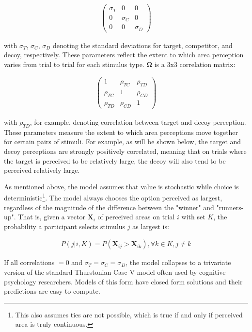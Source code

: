 \begin{align}
   \begin{pmatrix}
      \sigma_{T} & 0 & 0 \\
      0 & \sigma_{C} & 0 \\
      0 & 0 & \sigma_{D} 
   \end{pmatrix}
\label{eqn:S}
\end{align}

with $\sigma_{T}$, $\sigma_{C}$, $\sigma_{D}$ denoting the standard deviations for target, competitor, and decoy, respectively. These parameters reflect the extent to which area perception varies from trial to trial for each stimulus type. $\boldsymbol{\Omega}$ is a $3\text{x}3$ correlation matrix:

\begin{align}
   \begin{pmatrix}
      1 & \rho_{TC} & \rho_{TD} \\
      \rho_{TC} & 1 & \rho_{CD} \\
      \rho_{TD} & \rho_{CD} & 1 
   \end{pmatrix}
\label{eqn:O}
\end{align}

with $\rho_{TD}$, for example, denoting correlation between target and decoy perception. These parameters measure the extent to which area perceptions move together for certain pairs of stimuli. For example, as will be shown below, the target and decoy perceptions are strongly positively correlated, meaning that on trials where the target is perceived to be relatively large, the decoy will also tend to be perceived relatively large.

As mentioned above, the model assumes that value is stochastic while choice is deterministic\footnote{This also assumes ties are not possible, which is true if and only if perceived area is truly continuous.}. The model always chooses the option perceived as largest, regardless of the magnitude of the difference between the "winner" and "runners-up". That is, given a vector $\mathbf{X}_i$ of perceived areas on trial $i$ with set $K$, the probability a participant selects stimulus $j$ as largest is:

\begin{align}
   P(j|i,K)=P(\mathbf{X}_{ij}>\mathbf{X}_{ik}), \forall k \in K, j \neq k
   \label{eqn:pchoice}
\end{align}

If all correlations $=0$ and $\sigma_{T}=\sigma_{C}=\sigma_{D}$, the model collapses to a trivariate version of the standard Thurstonian Case V model \parencite{thurstone1927law} often used by cognitive psychology researchers. Models of this form have closed form solutions and their predictions are easy to compute.

